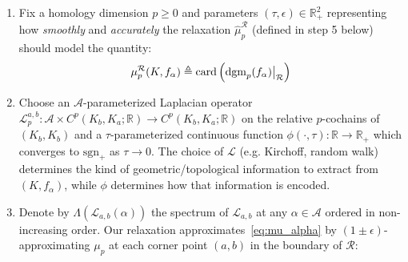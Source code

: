 \documentclass[10pt]{article}
\newenvironment{boxedenumerate}
  {\begin{mdframed}[font=\small, linewidth=1pt]}
  {\end{mdframed}}
\numberwithin{equation}{section}
\newcommand{\+}{%
	\raisebox{0.18ex}{\scaleobj{0.55}{+}}
}
\newcommand\restr[2]{{%
  \left.\kern-\nulldelimiterspace %
  #1 %
  \vphantom{\big|} %
  \right|_{#2} %
  }}
\theoremstyle{definition}
\theoremstyle{definition}
\begin{document}
\begin{boxedenumerate}
\begin{enumerate}
	\item Fix a homology dimension $p\geq 0$ and parameters $(\tau, \epsilon) \in \mathbb{R}_+^2$ representing how \emph{smoothly} and \emph{accurately} the relaxation $\hat{\mu}_p^\mathcal{R}$ (defined in step 5 below) should model the quantity: 
	\begin{equation}\label{eq:mu_alpha}
	\mu_p^{\mathcal{R}}(K, f_\alpha) \triangleq 
	\mathrm{card}\left(\restr{\mathrm{dgm}_p(f_\alpha)}{\mathcal{R}} \right) 
	\end{equation}
	\item Choose an $\mathcal{A}$-parameterized Laplacian operator $\mathcal{L}_p^{a,b} : \mathcal{A} \times C^p(K_b, K_a; \mathbb{R}) \to C^p(K_b, K_a; \mathbb{R})$ on the relative $p$-cochains of $(K_b, K_b)$ and a 
	$\tau$-parameterized continuous function $\phi(\cdot , \tau ) : \mathbb{R} \to \mathbb{R}_+$ which converges to $\mathrm{sgn}_+$ as $\tau \to 0$.
The choice of $\mathcal{L}$ (e.g. Kirchoff, random walk) determines the kind of geometric/topological information to extract from $(K, f_\alpha)$, while $\phi$ determines how that information is encoded.
	\item Denote by $\Lambda(\mathcal{L}_{a,b}(\alpha))$ the spectrum of $\mathcal{L}_{a,b}$ at any $\alpha \in \mathcal{A}$ ordered in non-increasing order. Our relaxation approximates~\eqref{eq:mu_alpha} by $(1 \pm \epsilon)$-approximating $\mu_p$ at each corner point $(a,b)$ in the boundary of $\mathcal{R}$: 

\end{enumerate}
\end{boxedenumerate}
\end{document}
